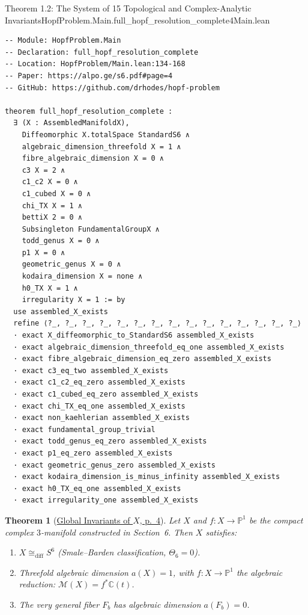 \documentclass[10pt]{article}
\newtheorem{theorem}{Theorem}[section]
\newcommand{\dbC}{\mathbb{C}}
\newcommand{\dbP}{\mathbb{P}}
\newcommand{\cM}{\mathcal{M}}
\gdef\hashchar{#}
\newcommand{\paperref}[2]{\href{https://alpo.ge/s6.pdf\hashchar page=#1}{#2}}
\begin{document}
\begin{comparativeblock}{Theorem 1.2: The System of 15 Topological and Complex-Analytic Invariants}{HopfProblem.Main.full_hopf_resolution_complete}{4}{Main.lean}
\begin{verbatim}
-- Module: HopfProblem.Main
-- Declaration: full_hopf_resolution_complete
-- Location: HopfProblem/Main.lean:134-168
-- Paper: https://alpo.ge/s6.pdf#page=4
-- GitHub: https://github.com/drhodes/hopf-problem

theorem full_hopf_resolution_complete :
  ∃ (X : AssembledManifoldX),
    Diffeomorphic X.totalSpace StandardS6 ∧
    algebraic_dimension_threefold X = 1 ∧
    fibre_algebraic_dimension X = 0 ∧
    c3 X = 2 ∧
    c1_c2 X = 0 ∧
    c1_cubed X = 0 ∧
    chi_TX X = 1 ∧
    bettiX 2 = 0 ∧
    Subsingleton FundamentalGroupX ∧
    todd_genus X = 0 ∧
    p1 X = 0 ∧
    geometric_genus X = 0 ∧
    kodaira_dimension X = none ∧
    h0_TX X = 1 ∧
    irregularity X = 1 := by
  use assembled_X_exists
  refine ⟨?_, ?_, ?_, ?_, ?_, ?_, ?_, ?_, ?_, ?_, ?_, ?_, ?_, ?_, ?_⟩
  · exact X_diffeomorphic_to_StandardS6 assembled_X_exists
  · exact algebraic_dimension_threefold_eq_one assembled_X_exists
  · exact fibre_algebraic_dimension_eq_zero assembled_X_exists
  · exact c3_eq_two assembled_X_exists
  · exact c1_c2_eq_zero assembled_X_exists
  · exact c1_cubed_eq_zero assembled_X_exists
  · exact chi_TX_eq_one assembled_X_exists
  · exact non_kaehlerian assembled_X_exists
  · exact fundamental_group_trivial
  · exact todd_genus_eq_zero assembled_X_exists
  · exact p1_eq_zero assembled_X_exists
  · exact geometric_genus_zero assembled_X_exists
  · exact kodaira_dimension_is_minus_infinity assembled_X_exists
  · exact h0_TX_eq_one assembled_X_exists
  · exact irregularity_one assembled_X_exists
\end{verbatim}
\tcblower
\begin{theorem}[\paperref{4}{Global Invariants of $X$, p.~4}]\label{thm:invariants-15}
Let $X$ and $f\colon X \to \dbP^1$ be the compact complex $3$-manifold constructed in Section~6. Then $X$ satisfies:
\begin{enumerate}[label=(\arabic*), itemsep=1pt, parsep=0pt]
    \item $X \cong_{\mathrm{diff}} S^6$ (Smale--Barden classification, $\Theta_6 = 0$).
    \item Threefold algebraic dimension $a(X) = 1$, with $f\colon X \to \dbP^1$ the algebraic reduction: $\cM(X) = f^*\dbC(t)$.
    \item The very general fiber $F_b$ has algebraic dimension $a(F_b) = 0$.

\end{enumerate}
\end{theorem}
\end{comparativeblock}
\end{document}
